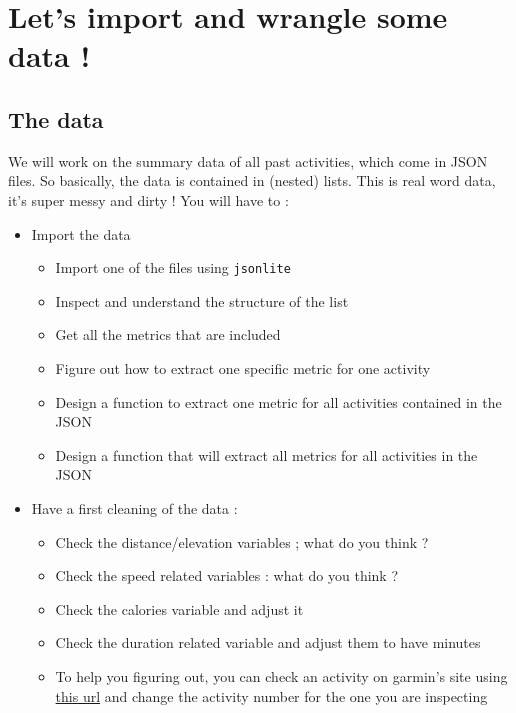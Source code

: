\documentclass[
]{book}
\providecommand{\tightlist}{%
  \setlength{\itemsep}{0pt}\setlength{\parskip}{0pt}}
\begin{document}
\hypertarget{lets-import-and-wrangle-some-data}{%
\section{Let's import and wrangle some data !}\label{lets-import-and-wrangle-some-data}}

\hypertarget{the-data}{%
\subsection{The data}\label{the-data}}

We will work on the summary data of all past activities, which come in JSON files. So basically, the data is contained in (nested) lists. This is real word data, it's super messy and dirty !
You will have to :

\begin{itemize}
\tightlist
\item
  Import the data

  \begin{itemize}
  \tightlist
  \item
    Import one of the files using \texttt{jsonlite}
  \item
    Inspect and understand the structure of the list
  \item
    Get all the metrics that are included
  \item
    Figure out how to extract one specific metric for one activity
  \item
    Design a function to extract one metric for all activities contained in the JSON
  \item
    Design a function that will extract all metrics for all activities in the JSON
  \end{itemize}
\item
  Have a first cleaning of the data :

  \begin{itemize}
  \tightlist
  \item
    Check the distance/elevation variables ; what do you think ?
  \item
    Check the speed related variables : what do you think ?
  \item
    Check the calories variable and adjust it
  \item
    Check the duration related variable and adjust them to have minutes
  \item
    To help you figuring out, you can check an activity on garmin's site using \href{https://connect.garmin.com/modern/activity/5570974040}{this url} and change the activity number for the one you are inspecting
  \end{itemize}
\end{itemize}
\end{document}
